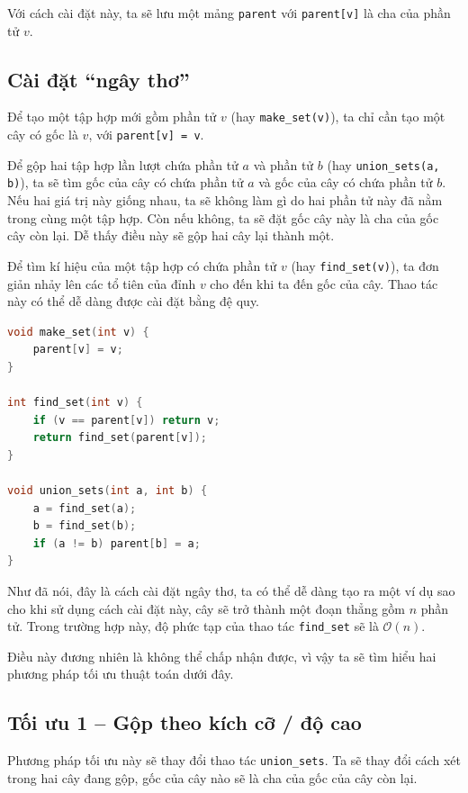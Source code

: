 Với cách cài đặt này, ta sẽ lưu một mảng \texttt{parent} với \texttt{parent[v]} là cha của phần tử $v$.


\subsection*{Cài đặt ``ngây thơ''}

Để tạo một tập hợp mới gồm phần tử $v$ (hay \texttt{make\_set(v)}), ta chỉ cần tạo một cây có gốc là $v$, với \texttt{parent[v] = v}.

Để gộp hai tập hợp lần lượt chứa phần tử $a$ và phần tử $b$ (hay \texttt{union\_sets(a, b)}), ta sẽ tìm gốc của cây có chứa phần tử $a$ và gốc của cây có chứa phần tử $b$. Nếu hai giá trị này giống nhau, ta sẽ không làm gì do hai phần tử này đã nằm trong cùng một tập hợp. Còn nếu không, ta sẽ đặt gốc cây này là cha của gốc cây còn lại. Dễ thấy điều này sẽ gộp hai cây lại thành một.

Để tìm kí hiệu của một tập hợp có chứa phần tử $v$ (hay \texttt{find\_set(v)}), ta đơn giản nhảy lên các tổ tiên của đỉnh $v$ cho đến khi ta đến gốc của cây. Thao tác này có thể dễ dàng được cài đặt bằng đệ quy.

\begin{lstlisting}[language=C++]
void make_set(int v) {
    parent[v] = v; 
}

int find_set(int v) {
    if (v == parent[v]) return v;
    return find_set(parent[v]); 
}

void union_sets(int a, int b) {
    a = find_set(a);
    b = find_set(b);
    if (a != b) parent[b] = a;
}
\end{lstlisting}

Như đã nói, đây là cách cài đặt ngây thơ, ta có thể dễ dàng tạo ra một ví dụ sao cho khi sử dụng cách cài đặt này, cây sẽ trở thành một đoạn thẳng gồm $n$ phần tử. Trong trường hợp này, độ phức tạp của thao tác \texttt{find\_set} sẽ là $\mathcal{O}(n)$.

Điều này đương nhiên là không thể chấp nhận được, vì vậy ta sẽ tìm hiểu hai phương pháp tối ưu thuật toán dưới đây.

\subsection*{Tối ưu 1 -- Gộp theo kích cỡ / độ cao}

Phương pháp tối ưu này sẽ thay đổi thao tác \texttt{union\_sets}. Ta sẽ thay đổi cách xét trong hai cây đang gộp, gốc của cây nào sẽ là cha của gốc của cây còn lại.

